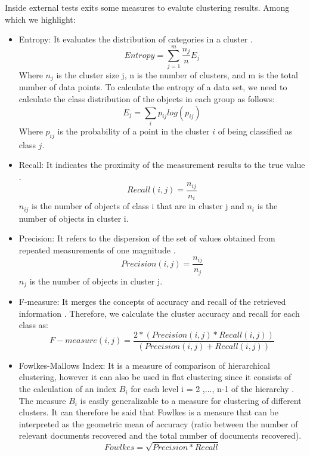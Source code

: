 Inside external tests exits some measures to evalute clustering results. Among which we highlight:

\begin{itemize}
    \item Entropy: It evaluates the distribution of categories in a cluster \citep{b40}.
    \begin{equation}
        Entropy =  \sum_{j=1}^{m} \frac{n_{j}}{n}E_{j}
    \end{equation}
    Where $n_{j}$ is the cluster size j, n is the number of clusters, and m is the total number of data points. To calculate the entropy of a data set, we need to calculate the class distribution of the objects in each group as follows:
    \begin{equation}
        E_{j} =  \sum_{i} p_{ij}log(p_{ij})
    \end{equation}
    Where $p_{ij}$ is the probability of a point in the cluster $i$ of being classified as class $j$.
    \item Recall: It indicates the proximity of the measurement results to the true value \citep{b41}.
    \begin{equation}
         Recall(i,j) = \frac{n_{ij}}{n_{i}}
    \end{equation}
    $n_{ij}$ is the number of objects of class i that are in cluster j and $n_{i}$ is the number of objects in cluster i.
    \item Precision: It refers to the dispersion of the set of values obtained from repeated measurements of one magnitude \citep{b41}.
        \begin{equation}
            Precision(i,j) = \frac{n_{ij}}{n_{j}}
        \end{equation}
     $n_{j}$ is the number of objects in cluster j.
    \item F-measure: It merges the concepts of accuracy and recall of the retrieved information \citep{b42}. Therefore, we calculate the cluster accuracy and recall for each class as:
    \begin{equation}
        F-measure(i,j) = \frac{2 * (Precision(i,j) * Recall(i,j))}{(Precision(i,j) + Recall(i,j))}
    \end{equation}
    \item Fowlkes-Mallows Index: It is a measure of comparison of hierarchical clustering, however it can also be used in flat clustering since it consists of the calculation of an index $B_{i}$ for each level i = 2 ,..., n-1 of the hierarchy \citep{b43}. The measure $B_{i}$ is easily generalizable to a measure for clustering of different clusters. It can therefore be said that Fowlkes is a measure that can be interpreted as the geometric mean of accuracy (ratio between the number of relevant documents recovered and the total number of documents recovered).
    \begin{equation}
        Fowlkes = \sqrt{Precision*Recall}
    \end{equation}



\end{itemize}
